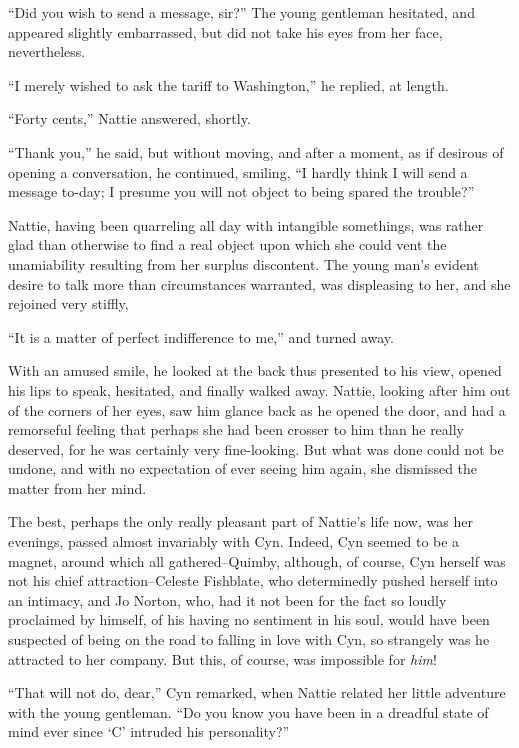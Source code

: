 ``Did you wish to send a message, sir?'' The young gentleman hesitated,
and appeared slightly embarrassed, but did not take his eyes from her
face, nevertheless.

``I merely wished to ask the tariff to Washington,'' he replied, at
length.

``Forty cents,'' Nattie answered, shortly.

``Thank you,'' he said, but without moving, and after a moment, as if
desirous of opening a conversation, he continued, smiling, ``I hardly
think I will send a message to-day; I presume you will not object to
being spared the trouble?''

Nattie, having been quarreling all day with intangible somethings, was
rather glad than otherwise to find a real object upon which she could
vent the unamiability resulting from her surplus discontent. The young
man's evident desire to talk more than circumstances warranted, was
displeasing to her, and she rejoined very stiffly,

``It is a matter of perfect indifference to me,'' and turned away.

With an amused smile, he looked at the back thus presented to his view,
opened his lips to speak, hesitated, and finally walked away. Nattie,
looking after him out of the corners of her eyes, saw him glance back as
he opened the door, and had a remorseful feeling that perhaps she had
been crosser to him than he really deserved, for he was certainly very
fine-looking. But what was done could not be undone, and with no
expectation of ever seeing him again, she dismissed the matter from her
mind.

The best, perhaps the only really pleasant part of Nattie's life now,
was her evenings, passed almost invariably with Cyn. Indeed, Cyn seemed
to be a magnet, around which all gathered--Quimby, although, of course,
Cyn herself was not his chief attraction--Celeste Fishblate, who
determinedly pushed herself into an intimacy, and Jo Norton, who, had it
not been for the fact so loudly proclaimed by himself, of his having no
sentiment in his soul, would have been suspected of being on the road to
falling in love with Cyn, so strangely was he attracted to her company.
But this, of course, was impossible for \emph{him}!

``That will not do, dear,'' Cyn remarked, when Nattie related her little
adventure with the young gentleman. ``Do you know you have been in a
dreadful state of mind ever since `C' intruded his personality?''

